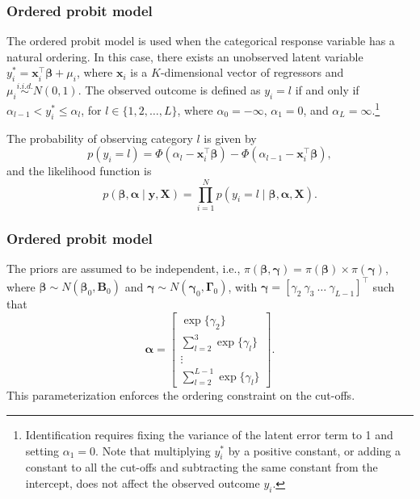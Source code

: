 \documentclass[12pt, compress]{beamer}
\begin{document}
\begin{frame}
	\frametitle{Ordered probit model}
The ordered probit model is used when the categorical response variable has a natural ordering. In this case, there exists an unobserved latent variable $y_i^* = \bm{x}_i^{\top}\bm{\beta} + \mu_i$, where $\bm{x}_i$ is a $K$-dimensional vector of regressors and $\mu_i \stackrel{i.i.d.}{\sim} N(0,1)$. The observed outcome is defined as $y_i = l$ if and only if $\alpha_{l-1} < y_i^* \leq \alpha_l$, for $l \in \{1, 2, \dots, L\}$, where $\alpha_0 = -\infty$, $\alpha_1 = 0$, and $\alpha_L = \infty$.\footnote{Identification requires fixing the variance of the latent error term to 1 and setting $\alpha_1 = 0$. Note that multiplying $y_i^*$ by a positive constant, or adding a constant to all the cut-offs and subtracting the same constant from the intercept, does not affect the observed outcome $y_i$.} 

The probability of observing category $l$ is given by
\[
p(y_i = l) = \Phi(\alpha_l - \bm{x}_i^{\top}\bm{\beta}) - \Phi(\alpha_{l-1} - \bm{x}_i^{\top}\bm{\beta}),
\]
and the likelihood function is
\[
p(\bm{\beta}, \bm{\alpha} \mid \bm{y}, \bm{X}) = \prod_{i=1}^{N} p(y_i = l \mid \bm{\beta}, \bm{\alpha}, \bm{X}).
\]

\end{frame}

\begin{frame}
	\frametitle{Ordered probit model}
The priors are assumed to be independent, i.e., $\pi(\bm{\beta}, \bm{\gamma}) = \pi(\bm{\beta}) \times \pi(\bm{\gamma})$, where $\bm{\beta} \sim N(\bm{\beta}_0, \bm{B}_0)$ and $\bm{\gamma} \sim N(\bm{\gamma}_0, \bm{\Gamma}_0)$, with $\bm{\gamma} = [\gamma_2 \ \gamma_3 \ \dots \ \gamma_{L-1}]^{\top}$ such that
\[
\bm{\alpha} = 
\begin{bmatrix}
	\exp\{\gamma_2\} \\ 
	\sum_{l=2}^{3} \exp\{\gamma_l\} \\ 
	\vdots \\ 
	\sum_{l=2}^{L-1} \exp\{\gamma_l\}
\end{bmatrix}.
\]
This parameterization enforces the ordering constraint on the cut-offs.
\end{frame}
\end{document}
